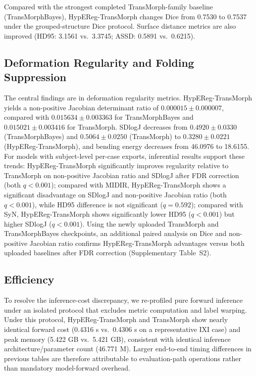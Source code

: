 \documentclass[11pt,a4paper]{article}
\begin{document}
Compared with the strongest completed TransMorph-family baseline (TransMorphBayes), HypEReg-TransMorph changes Dice from 0.7530 to 0.7537 under the grouped-structure Dice protocol. Surface distance metrics are also improved (HD95: 3.1561 vs.\ 3.3745; ASSD: 0.5891 vs.\ 0.6215).

\subsection{Deformation Regularity and Folding Suppression}
The central findings are in deformation regularity metrics. HypEReg-TransMorph yields a non-positive Jacobian determinant ratio of \(0.000015 \pm 0.000007\), compared with \(0.015634 \pm 0.003363\) for TransMorphBayes and \(0.015021 \pm 0.003416\) for TransMorph. SDlogJ decreases from \(0.4920 \pm 0.0330\) (TransMorphBayes) and \(0.5064 \pm 0.0250\) (TransMorph) to \(0.3280 \pm 0.0221\) (HypEReg-TransMorph), and bending energy decreases from 46.0976 to 18.6155.
For models with subject-level per-case exports, inferential results support these trends: HypEReg-TransMorph significantly improves regularity relative to TransMorph on non-positive Jacobian ratio and SDlogJ after FDR correction (both \(q<0.001\)); compared with MIDIR, HypEReg-TransMorph shows a significant disadvantage on SDlogJ and non-positive Jacobian ratio (both \(q<0.001\)), while HD95 difference is not significant (\(q=0.592\)); compared with SyN, HypEReg-TransMorph shows significantly lower HD95 (\(q<0.001\)) but higher SDlogJ (\(q<0.001\)). Using the newly uploaded TransMorph and TransMorphBayes checkpoints, an additional paired analysis on Dice and non-positive Jacobian ratio confirms HypEReg-TransMorph advantages versus both uploaded baselines after FDR correction (Supplementary Table~S2).

\subsection{Efficiency}
To resolve the inference-cost discrepancy, we re-profiled pure forward inference under an isolated protocol that excludes metric computation and label warping. Under this protocol, HypEReg-TransMorph and TransMorph show nearly identical forward cost (0.4316 s vs.\ 0.4306 s on a representative IXI case) and peak memory (5.422 GB vs.\ 5.421 GB), consistent with identical inference architecture/parameter count (46.771 M). Larger end-to-end timing differences in previous tables are therefore attributable to evaluation-path operations rather than mandatory model-forward overhead.
\end{document}
